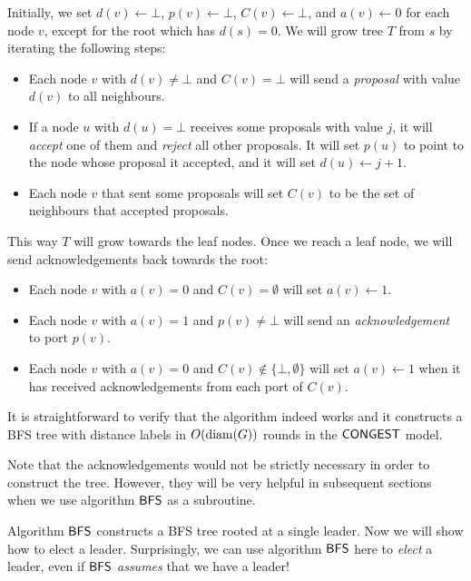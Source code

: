 Initially, we set $d(v) \gets \bot$, $p(v) \gets \bot$, $C(v) \gets \bot$, and $a(v) \gets 0$ for each node $v$, except for the root which has $d(s) = 0$. We will grow tree $T$ from $s$ by iterating the following steps:
\begin{itemize}
    \item Each node $v$ with $d(v) \ne \bot$ and $C(v) = \bot$ will send a \emph{proposal} with value $d(v)$ to all neighbours.
    \item If a node $u$ with $d(u) = \bot$ receives some proposals with value $j$, it will \emph{accept} one of them and \emph{reject} all other proposals. It will set $p(u)$ to point to the node whose proposal it accepted, and it will set $d(u) \gets j+1$.
    \item Each node $v$ that sent some proposals will set $C(v)$ to be the set of neighbours that accepted proposals.
\end{itemize}
This way $T$ will grow towards the leaf nodes. Once we reach a leaf node, we will send acknowledgements back towards the root:
\begin{itemize}
    \item Each node $v$ with $a(v) = 0$ and $C(v) = \emptyset$ will set $a(v) \gets 1$.
    \item Each node $v$ with $a(v) = 1$ and $p(v) \ne \bot$ will send an \emph{acknowledgement} to port $p(v)$.
    \item Each node $v$ with $a(v) = 0$ and $C(v) \notin \{ \bot, \emptyset \}$ will set $a(v) \gets 1$ when it has received acknowledgements from each port of $C(v)$.
\end{itemize}
It is straightforward to verify that the algorithm indeed works and it constructs a BFS tree with distance labels in $O(\operatorname{diam}(G))$ rounds in the $\textup{\sffamily CONGEST}$ model.

Note that the acknowledgements would not be strictly necessary in order to construct the tree. However, they will be very helpful in subsequent sections when we use algorithm $\textup{\sffamily BFS}$ as a subroutine.


\label{sec:leader}

Algorithm $\textup{\sffamily BFS}$ constructs a BFS tree rooted at a single leader. Now we will show how to elect a leader. Surprisingly, we can use algorithm $\textup{\sffamily BFS}$ here to \emph{elect} a leader, even if $\textup{\sffamily BFS}$ \emph{assumes} that we have a leader!

